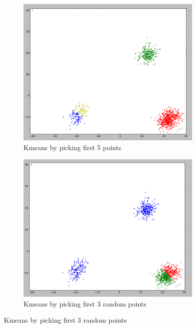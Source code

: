 \begin{figure}
  \begin{subfigure}{.33\textwidth}
    \centering
    \includegraphics[width=\textwidth]{shots/clusters-firstk-5}
    \caption{Kmeans by picking first 5 points}
    \label{1-trilinear-compositing}
  \end{subfigure}
  \begin{subfigure}{.33\textwidth}
    \centering
    \includegraphics[width=\textwidth]{shots/clusters-random-3}
    \caption{Kmeans by picking first 3 random points}
    \label{1-trilinear-compositing}
  \end{subfigure}

\end{figure}
